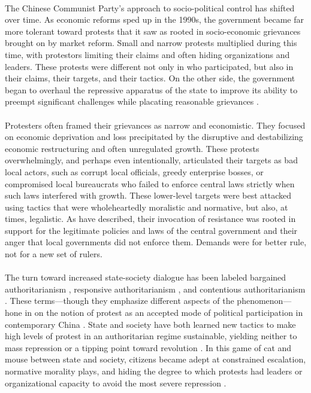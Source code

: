 \documentclass[12pt]{article}
\begin{document}
\begin{CJK*}{UTF8}{gbsn}
\paragraph{} The Chinese Communist Party's approach to socio-political control has shifted over time. As economic reforms sped up in the 1990s, the government became far more tolerant toward protests that it saw as rooted in socio-economic grievances brought on by market reform. Small and narrow protests multiplied during this time, with protestors limiting their claims and often hiding organizations and leaders. These protests were different not only in who participated, but also in their claims, their targets, and their tactics. On the other side, the government began to overhaul the repressive apparatus of the state to improve its ability to preempt significant challenges while placating reasonable grievances \citep{tanner2004china}.

\paragraph{} Protesters often framed their grievances as narrow and economistic. They focused on economic deprivation and loss precipitated by the disruptive and destabilizing economic restructuring and often unregulated growth. These protests overwhelmingly, and perhaps even intentionally, articulated their targets as bad local actors, such as corrupt local officials, greedy enterprise bosses, or compromised local bureaucrats who failed to enforce central laws strictly when such laws interfered with growth. These lower-level targets were best attacked using tactics that were wholeheartedly moralistic and normative, but also, at times, legalistic. As \cite{obrien2006rightful} have described, their invocation of resistance was rooted in support for the legitimate policies and laws of the central government and their anger that local governments did not enforce them. Demands were for better rule, not for a new set of rulers.

\paragraph{} The turn toward increased state-society dialogue has been labeled bargained authoritarianism \citep{lee2013power}, responsive authoritarianism \citep{heurlin2017responsive}, and contentious authoritarianism \citep{chen2012social}. These terms---though they emphasize different aspects of the phenomenon---hone in on the notion of protest as an accepted mode of political participation in contemporary China \citep{tang2016populist}. State and society have both learned new tactics to make high levels of protest in an authoritarian regime sustainable, yielding neither to mass repression or a tipping point toward revolution \citep{heurlin2017responsive,lee2013power,su2010street,cai2008local}. In this game of cat and mouse between state and society, citizens became adept at constrained escalation, normative morality plays, and hiding the degree to which protests had leaders or organizational capacity to avoid the most severe repression \citep{o2015repression,fu2017disguised}.


\end{CJK*}
\end{document}
